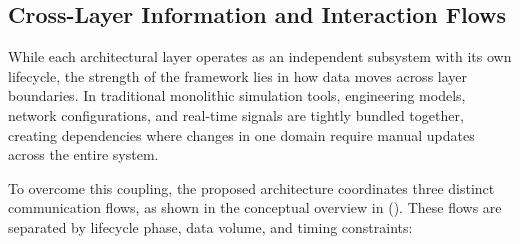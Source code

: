 \subsection{Cross-Layer Information and Interaction Flows}
\label{sec:architecture_flows}

While each architectural layer operates as an independent subsystem with its own lifecycle, the strength of the framework lies in how data moves across layer boundaries. In traditional monolithic simulation tools, engineering models, network configurations, and real-time signals are tightly bundled together, creating dependencies where changes in one domain require manual updates across the entire system.

To overcome this coupling, the proposed architecture coordinates three distinct communication flows, as shown in the conceptual overview in  (). These flows are separated by lifecycle phase, data volume, and timing constraints:

